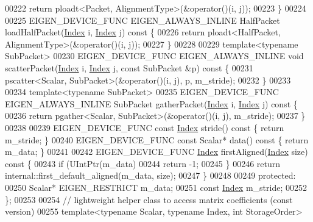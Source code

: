 \begin{DoxyCode}
00222     \textcolor{keywordflow}{return} ploadt<Packet, AlignmentType>(&operator()(i, j));
00223   \}
00224 
00225   EIGEN\_DEVICE\_FUNC EIGEN\_ALWAYS\_INLINE HalfPacket loadHalfPacket(\hyperlink{namespace_eigen_a62e77e0933482dafde8fe197d9a2cfde}{Index} i, 
      \hyperlink{namespace_eigen_a62e77e0933482dafde8fe197d9a2cfde}{Index} j)\textcolor{keyword}{ const }\{
00226     \textcolor{keywordflow}{return} ploadt<HalfPacket, AlignmentType>(&operator()(i, j));
00227   \}
00228 
00229   \textcolor{keyword}{template}<\textcolor{keyword}{typename} SubPacket>
00230   EIGEN\_DEVICE\_FUNC EIGEN\_ALWAYS\_INLINE \textcolor{keywordtype}{void} scatterPacket(\hyperlink{namespace_eigen_a62e77e0933482dafde8fe197d9a2cfde}{Index} i, \hyperlink{namespace_eigen_a62e77e0933482dafde8fe197d9a2cfde}{Index} j, \textcolor{keyword}{const} SubPacket &p)\textcolor{keyword}{
       const }\{
00231     pscatter<Scalar, SubPacket>(&operator()(i, j), p, m\_stride);
00232   \}
00233 
00234   \textcolor{keyword}{template}<\textcolor{keyword}{typename} SubPacket>
00235   EIGEN\_DEVICE\_FUNC EIGEN\_ALWAYS\_INLINE SubPacket gatherPacket(\hyperlink{namespace_eigen_a62e77e0933482dafde8fe197d9a2cfde}{Index} i, 
      \hyperlink{namespace_eigen_a62e77e0933482dafde8fe197d9a2cfde}{Index} j)\textcolor{keyword}{ const }\{
00236     \textcolor{keywordflow}{return} pgather<Scalar, SubPacket>(&operator()(i, j), m\_stride);
00237   \}
00238 
00239   EIGEN\_DEVICE\_FUNC \textcolor{keyword}{const} \hyperlink{namespace_eigen_a62e77e0933482dafde8fe197d9a2cfde}{Index} stride()\textcolor{keyword}{ const }\{ \textcolor{keywordflow}{return} m\_stride; \}
00240   EIGEN\_DEVICE\_FUNC \textcolor{keyword}{const} Scalar* data()\textcolor{keyword}{ const }\{ \textcolor{keywordflow}{return} m\_data; \}
00241 
00242   EIGEN\_DEVICE\_FUNC \hyperlink{namespace_eigen_a62e77e0933482dafde8fe197d9a2cfde}{Index} firstAligned(\hyperlink{namespace_eigen_a62e77e0933482dafde8fe197d9a2cfde}{Index} size)\textcolor{keyword}{ const }\{
00243     \textcolor{keywordflow}{if} (UIntPtr(m\_data)%
00244       \textcolor{keywordflow}{return} -1;
00245     \}
00246     \textcolor{keywordflow}{return} internal::first\_default\_aligned(m\_data, size);
00247   \}
00248 
00249   \textcolor{keyword}{protected}:
00250   Scalar* EIGEN\_RESTRICT m\_data;
00251   \textcolor{keyword}{const} \hyperlink{namespace_eigen_a62e77e0933482dafde8fe197d9a2cfde}{Index} m\_stride;
00252 \};
00253 
00254 \textcolor{comment}{// lightweight helper class to access matrix coefficients (const version)}
00255 \textcolor{keyword}{template}<\textcolor{keyword}{typename} Scalar, \textcolor{keyword}{typename} Index, \textcolor{keywordtype}{int} StorageOrder>

\end{DoxyCode}
